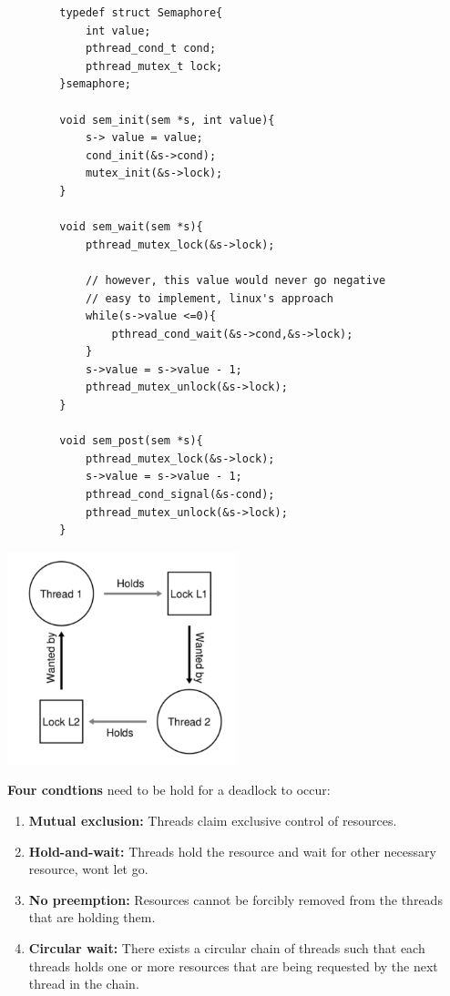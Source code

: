     \begin{lstlisting}
        typedef struct Semaphore{
            int value;
            pthread_cond_t cond;
            pthread_mutex_t lock;
        }semaphore;

        void sem_init(sem *s, int value){
            s-> value = value;
            cond_init(&s->cond);
            mutex_init(&s->lock);
        }

        void sem_wait(sem *s){
            pthread_mutex_lock(&s->lock);

            // however, this value would never go negative
            // easy to implement, linux's approach
            while(s->value <=0){
                pthread_cond_wait(&s->cond,&s->lock);
            }
            s->value = s->value - 1;
            pthread_mutex_unlock(&s->lock);
        }

        void sem_post(sem *s){
            pthread_mutex_lock(&s->lock);
            s->value = s->value - 1;
            pthread_cond_signal(&s-cond);
            pthread_mutex_unlock(&s->lock);
        }

    \end{lstlisting}



    \includegraphics[width=0.5\textwidth]{chapters/Cucurrency/Cucurrency/simple_deadlock.png}

    \textbf{Four condtions} need to be hold for a deadlock to occur:

    \begin{enumerate}
        \item \textbf{Mutual exclusion:} Threads claim exclusive control of resources.
        \item \textbf{Hold-and-wait:} Threads hold the resource and wait for other necessary resource, wont let go.
        \item \textbf{No preemption:} Resources cannot be forcibly removed from the threads that are holding them.
        \item \textbf{Circular wait:} There exists a circular chain of threads such that each threads holds one or more 
        resources that are being requested by the next thread in the chain.
    \end{enumerate}

